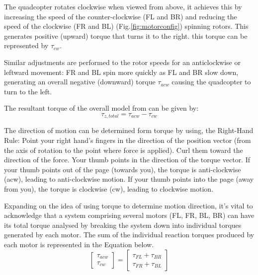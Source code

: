\documentclass{article}
\begin{document}
The quadcopter rotates clockwise when viewed from above, it achieves this by
increasing the speed of the counter-clockwise (FL and BR) and reducing the speed
of the clockwise (FR and BL) (Fig.\ref{fig:motorconfig}) spinning rotors. This
generates positive (upward) torque that turns it to the right. this torque can
be represented by \(\tau_{cw}\).

Similar adjustments are performed to the rotor speeds for an anticlockwise or
leftward movement: FR and BL spin more quickly as FL and BR slow down,
generating an overall negative (downward) torque \(\tau_{acw}\) causing the
quadcopter to turn to the left.

The resultant torque of the overall model from can be given by:
\begin{equation}
  \tau_{z, total} = \tau_{acw} - \tau_{cw}
  \label{total_torque}
\end{equation}

The direction of motion can be determined form torque by using, the Right-Hand
Rule: Point your right hand's fingers in the direction of the position vector
(from the axis of rotation to the point where force is applied). Curl them
toward the direction of the force. Your thumb points in the direction of the
torque vector. If your thumb points out of the page (towards you), the torque is
anti-clockwise (acw), leading to anti-clockwise motion. If your thumb points
into the page (away from you), the torque is clockwise (cw), leading to
clockwise motion.

Expanding on the idea of using torque to determine motion direction, it's vital
to acknowledge that a system comprising several motors (FL, FR, BL, BR)  can
have its total torque analysed by breaking the system down into individual
torques generated by each motor. The sum of the individual reaction torques
produced by each motor is represented in the Equation below. 
\begin{equation}
  \begin{bmatrix}
    \tau_{acw}\\
    \tau_{cw}
  \end{bmatrix} = 
  \begin{bmatrix}
    \tau_{FL} + \tau_{BR}\\
    \tau_{FR} + \tau_{BL}
  \end{bmatrix}
\end{equation}
\end{document}
